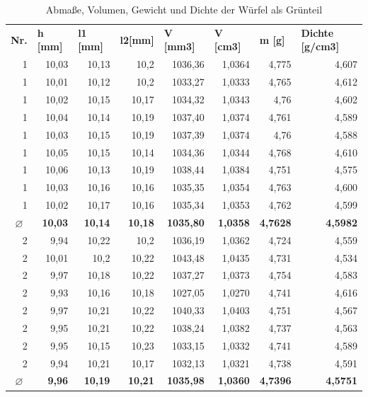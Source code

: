 \begin{table}[h]
    \centering
    \caption{Abmaße, Volumen, Gewicht und Dichte der Würfel als Grünteil}
      \begin{tabular}{crrrrrrr}
      \toprule
      \textbf{Nr.} & \multicolumn{1}{l}{\textbf{h [mm]}} & \multicolumn{1}{l}{\textbf{l1 [mm]}} & \multicolumn{1}{l}{\textbf{l2[mm]}} & \multicolumn{1}{l}{\textbf{V [mm3]}} & \multicolumn{1}{l}{\textbf{V [cm3]}} & \multicolumn{1}{l}{\textbf{m [g]}} & \multicolumn{1}{l}{\textbf{Dichte [g/cm3]}} \\
      \multicolumn{1}{r}{1} & 10,03 & 10,13 & 10,2  & 1036,36 & 1,0364 & 4,775 & 4,607 \\
      \multicolumn{1}{r}{1} & 10,01 & 10,12 & 10,2  & 1033,27 & 1,0333 & 4,765 & 4,612 \\
      \multicolumn{1}{r}{1} & 10,02 & 10,15 & 10,17 & 1034,32 & 1,0343 & 4,76  & 4,602 \\
      \multicolumn{1}{r}{1} & 10,04 & 10,14 & 10,19 & 1037,40 & 1,0374 & 4,761 & 4,589 \\
      \multicolumn{1}{r}{1} & 10,03 & 10,15 & 10,19 & 1037,39 & 1,0374 & 4,76  & 4,588 \\
      \multicolumn{1}{r}{1} & 10,05 & 10,15 & 10,14 & 1034,36 & 1,0344 & 4,768 & 4,610 \\
      \multicolumn{1}{r}{1} & 10,06 & 10,13 & 10,19 & 1038,44 & 1,0384 & 4,751 & 4,575 \\
      \multicolumn{1}{r}{1} & 10,03 & 10,16 & 10,16 & 1035,35 & 1,0354 & 4,763 & 4,600 \\
      \multicolumn{1}{r}{1} & 10,02 & 10,17 & 10,16 & 1035,34 & 1,0353 & 4,762 & 4,599 \\
      \textbf{\textbf{$\varnothing$}} & \textbf{10,03} & \textbf{10,14} & \textbf{10,18} & \textbf{1035,80} & \textbf{1,0358} & \textbf{4,7628} & \textbf{4,5982} \\
      \midrule
      \multicolumn{1}{r}{2} & 9,94  & 10,22 & 10,2  & 1036,19 & 1,0362 & 4,724 & 4,559 \\
      \multicolumn{1}{r}{2} & 10,01 & 10,2  & 10,22 & 1043,48 & 1,0435 & 4,731 & 4,534 \\
      \multicolumn{1}{r}{2} & 9,97  & 10,18 & 10,22 & 1037,27 & 1,0373 & 4,754 & 4,583 \\
      \multicolumn{1}{r}{2} & 9,93  & 10,16 & 10,18 & 1027,05 & 1,0270 & 4,741 & 4,616 \\
      \multicolumn{1}{r}{2} & 9,97  & 10,21 & 10,22 & 1040,33 & 1,0403 & 4,751 & 4,567 \\
      \multicolumn{1}{r}{2} & 9,95  & 10,21 & 10,22 & 1038,24 & 1,0382 & 4,737 & 4,563 \\
      \multicolumn{1}{r}{2} & 9,95  & 10,15 & 10,23 & 1033,15 & 1,0332 & 4,741 & 4,589 \\
      \multicolumn{1}{r}{2} & 9,94  & 10,21 & 10,17 & 1032,13 & 1,0321 & 4,738 & 4,591 \\
      \textbf{\textbf{$\varnothing$}} & \textbf{9,96} & \textbf{10,19} & \textbf{10,21} & \textbf{1035,98} & \textbf{1,0360} & \textbf{4,7396} & \textbf{4,5751} \\
      \bottomrule
      \end{tabular}%
    \label{Grünteilmaße}%
  \end{table}%
